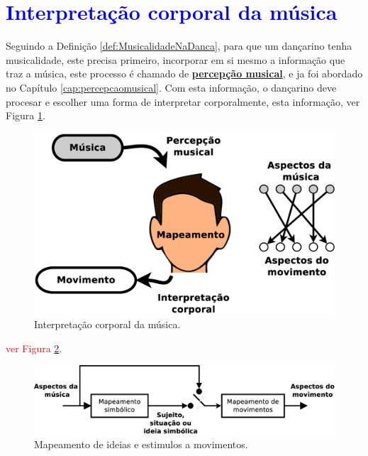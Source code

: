 \section{\textcolor{blue}{Interpretação corporal da música}}
Seguindo a Definição \ref{def:MusicalidadeNaDanca},
para que um dançarino tenha musicalidade, este precisa primeiro,
incorporar em si mesmo a informação que traz a música, 
este processo é chamado de \hyperref[cap:percepcaomusical]{\textbf{percepção musical}}, 
e ja foi abordado no Capítulo \ref{cap:percepcaomusical}.
Com esta informação, o dançarino deve procesar e escolher uma forma de interpretar corporalmente,
esta informação, ver Figura \ref{fig:interpretacion-corporal}.
\begin{figure}[!h]
  \centering
    \includegraphics[width=1.00\textwidth]{chapters/cap-musicalidade/interpretacion-corporal.eps}
\caption{Interpretação corporal da música.}
\label{fig:interpretacion-corporal}
\end{figure}


\textcolor{red}{ver Figura \ref{fig:mapeamento}}.
\begin{figure}[!h]
  \centering
    \includegraphics[width=1.00\textwidth]{chapters/cap-musicalidade/mapeamento.eps}
\caption{Mapeamento de ideias e estimulos a movimentos.}
\label{fig:mapeamento}
\end{figure}


